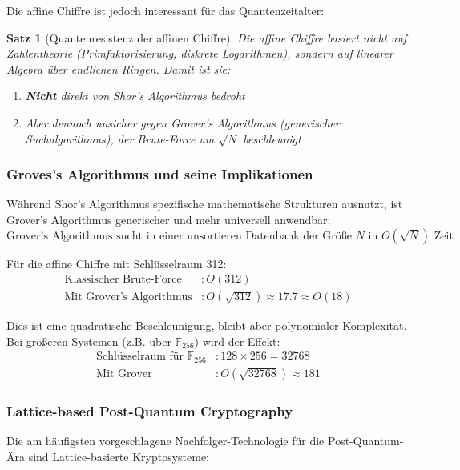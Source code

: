 ﻿\documentclass[12pt,a4paper]{article}
\newtheorem{theorem}{Satz}
\begin{document}
	Die affine Chiffre ist jedoch interessant für das Quantenzeitalter:
	\begin{theorem}[Quantenresistenz der affinen Chiffre]
		Die affine Chiffre basiert nicht auf Zahlentheorie (Primfaktorisierung, diskrete Logarithmen), sondern auf linearer Algebra über endlichen Ringen. Damit ist sie:
		\begin{enumerate}
			\item \textbf{Nicht} direkt von Shor's Algorithmus bedroht
			\item Aber dennoch unsicher gegen Grover's Algorithmus (generischer Suchalgorithmus), der Brute-Force um $\sqrt{N}$ beschleunigt
		\end{enumerate}
	\end{theorem}
	
	\subsubsection{Groves's Algorithmus und seine Implikationen}
	
	Während Shor's Algorithmus spezifische mathematische Strukturen ausnutzt, ist Grover's Algorithmus generischer und mehr universell anwendbar:
	\begin{equation}
		\text{Grover's Algorithmus sucht in einer unsortieren Datenbank der Größe } N \text{ in } O(\sqrt{N}) \text{ Zeit}
	\end{equation}
	
	Für die affine Chiffre mit Schlüsselraum 312:
	\begin{align}
		\text{Klassischer Brute-Force} &: O(312) \\
		\text{Mit Grover's Algorithmus} &: O(\sqrt{312}) \approx 17.7 \approx O(18)
	\end{align}
	
	Dies ist eine quadratische Beschleunigung, bleibt aber polynomialer Komplexität. Bei größeren Systemen (z.B. über $\mathbb{F}_{256}$) wird der Effekt:
	\begin{align}
		\text{Schlüsselraum für } \mathbb{F}_{256} &: 128 \times 256 = 32768 \\
		\text{Mit Grover} &: O(\sqrt{32768}) \approx 181
	\end{align}
	
	\subsubsection{Lattice-based Post-Quantum Cryptography}
	
	Die am häufigsten vorgeschlagene Nachfolger-Technologie für die Post-Quantum-Ära sind Lattice-basierte Kryptosysteme:
	
\end{document}
